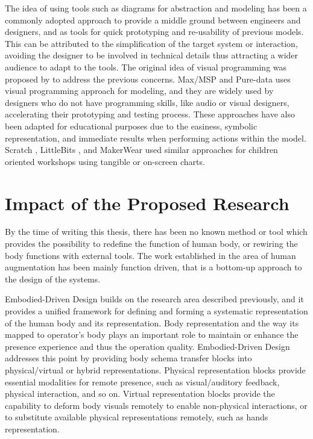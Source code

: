 The idea of using tools such as diagrams for abstraction and modeling has been a commonly adopted approach to provide a middle ground between engineers and designers, and as tools for quick prototyping and re-usability of previous models. This can be attributed to the simplification of the target system or interaction, avoiding the designer to be involved in technical details thus attracting a wider audience to adapt to the tools. The original idea of visual programming was proposed by \cite{shu1988visual} to address the previous concerns. Max/MSP \cite{puckette1990max} and Pure-data \cite{puckette1997pure} uses visual programming approach for modeling, and they are widely used by designers who do not have programming skills, like audio or visual designers, accelerating their prototyping and testing process. These approaches have also been adapted for educational purposes due to the easiness, symbolic representation, and immediate results when performing actions within the model. Scratch \cite{maloney2010scratch}, LittleBits \cite{bdeir2011electronics}, and MakerWear \cite{kazemitabaar2017makerwear} used similar approaches for children oriented workshops using tangible or on-screen charts. 

\section{Impact of the Proposed Research}

By the time of writing this thesis, there has been no known method or tool which provides the possibility to redefine the function of human body, or rewiring the body functions with external tools. The work established in the area of human augmentation has been mainly function driven, that is a bottom-up approach to the design of the systems.

Embodied-Driven Design builds on the research area described previously, and it provides a unified framework for defining and forming a systematic representation of the human body and its representation. Body representation and the way its mapped to operator's body plays an important role to maintain or enhance the presence experience and thus the operation quality. Embodied-Driven Design addresses this point by providing body schema transfer blocks into physical/virtual or hybrid representations. Physical representation blocks provide essential modalities for remote presence, such as visual/auditory feedback, physical interaction, and so on. Virtual representation blocks provide the capability to deform body visuals remotely to enable non-physical interactions, or to substitute available physical representations remotely, such as hands representation.  

